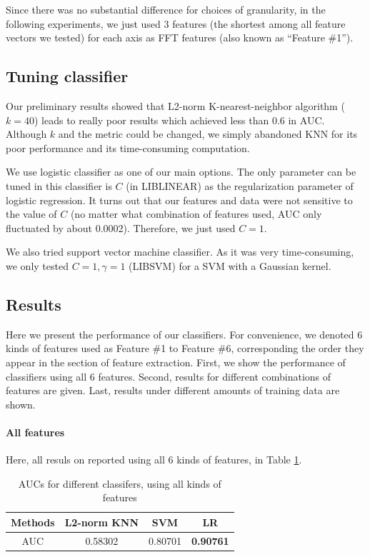 \documentclass{article} %
\begin{document}
Since there was no substantial difference for choices of granularity, in the following experiments, we just used 3 features (the shortest among all feature vectors we tested) for each axis as FFT features (also known as ``Feature \#1'').

\subsection{Tuning classifier}
Our preliminary results showed that L2-norm K-nearest-neighbor algorithm ($k=40$) leads to really poor results which achieved less than 0.6 in AUC. Although $k$ and the metric could be changed, we simply abandoned KNN for its poor performance and its time-consuming computation.

We use logistic classifier as one of our main options. The only parameter can be tuned in this classifier is $C$ (in LIBLINEAR) as the regularization parameter of logistic regression. It turns out that our features and data were not sensitive to the value of $C$ (no matter what combination of features used, AUC only fluctuated by about 0.0002). Therefore, we just used $C=1$.

We also tried support vector machine classifier. As it was very time-consuming, we only tested $C=1, \gamma=1$ (LIBSVM) for a SVM with a Gaussian kernel.

\subsection{Results}

Here we present the performance of our classifiers. For convenience, we denoted 6 kinds of features used as Feature \#1 to Feature \#6, corresponding the order they appear in the section of feature extraction. First, we show the performance of classifiers using all 6 features. Second, results for different combinations of features are given. Last, results under different amounts of training data are shown.

\paragraph{All features} %
\label{ssub:all_features}
Here, all resuls on reported using all 6 kinds of features, in Table \ref{tbl:test_result}.

\begin{table}[!ht]
\caption{AUCs for different classifers, using all kinds of features}
\label{tbl:test_result}
	\begin{center}
		\begin{tabular}{ c | c  c  c  }
			\hline
			 Methods & L2-norm KNN & SVM & LR \\
			 \hline
			 AUC & 0.58302 & 0.80701 & \textbf{0.90761} \\
			 \hline
		\end{tabular}
	\end{center}
\end{table}
\end{document}

